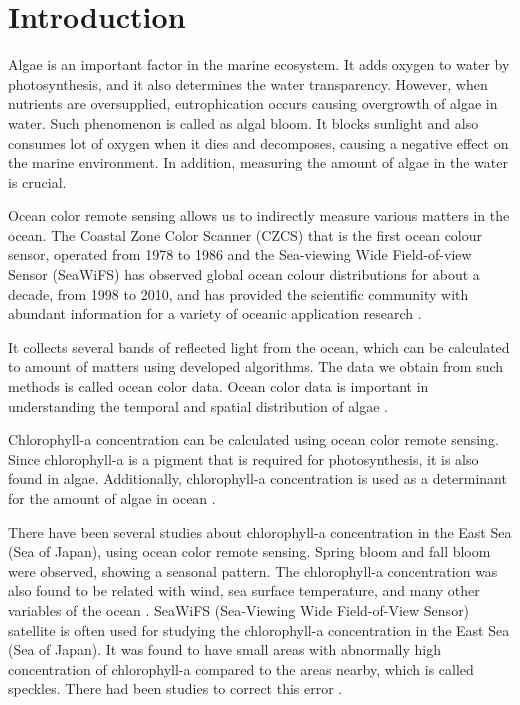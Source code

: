 \section{Introduction}

Algae is an important factor in the marine ecosystem. It adds oxygen to water by photosynthesis, and it also determines the water transparency. However, when nutrients are oversupplied, eutrophication occurs causing overgrowth of algae in water. Such phenomenon is called as algal bloom. It blocks sunlight and also consumes lot of oxygen when it dies and decomposes, causing a negative effect on the marine environment. In addition, measuring the amount of algae in the water is crucial.

Ocean color remote sensing allows us to indirectly measure various matters in the ocean. The Coastal Zone Color Scanner (CZCS) that is the first ocean colour sensor, operated from 1978 to 1986 and the Sea-viewing Wide Field-of-view Sensor (SeaWiFS) has observed global ocean colour distributions for about a decade, from 1998 to 2010, and has provided the scientific community with abundant information for a variety of oceanic application research \cite{kyung2013characteristics, hooker1992An}.

It collects several bands of reflected light from the ocean, which can be calculated to amount of matters using developed algorithms. The data we obtain from such methods is called ocean color data. Ocean color data is important in understanding the temporal and spatial distribution of algae \cite{kimhc2016surface}.

Chlorophyll-a concentration can be calculated using ocean color remote sensing. Since chlorophyll-a is a pigment that is required for photosynthesis, it is also found in algae. Additionally, chlorophyll-a concentration is used as a determinant for the amount of algae in ocean \cite{o2000ocean}. 

There have been several studies about chlorophyll-a concentration in the East Sea (Sea of Japan), using ocean color remote sensing. Spring bloom and fall bloom were observed, showing a seasonal pattern. The chlorophyll-a concentration was also found to be related with wind, sea surface temperature, and many other variables of the ocean \cite{yamada2004seasonal}. SeaWiFS (Sea-Viewing Wide Field-of-View Sensor) satellite is often used for studying the chlorophyll-a concentration in the East Sea (Sea of Japan). It was found to have small areas with abnormally high concentration of chlorophyll-a compared to the areas nearby, which is called speckles. There had been studies to correct this error \cite{chae2009characteristics}. 

